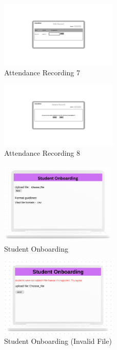 \documentclass[letterpaper,12pt,oneside,listof=totoc]{scrreprt}
\begin{document}
\begin{figure}[htbp]
  \centering
  \includegraphics[width=0.5\textwidth]{Attendence_recording7.png}
  \caption{Attendance Recording 7}
\end{figure}

\begin{figure}[htbp]
  \centering
  \includegraphics[width=0.5\textwidth]{Attendence_recording8.png}
  \caption{Attendance Recording 8}
\end{figure}

\begin{figure}[htbp]
  \centering
  \includegraphics[width=0.5\textwidth]{Student_onboarding.png}
  \caption{Student Onboarding}
\end{figure}

\begin{figure}[htbp]
  \centering
  \includegraphics[width=0.5\textwidth]{Student_onboarding(InvalidFile).png}
  \caption{Student Onboarding (Invalid File)}
\end{figure}
\end{document}
